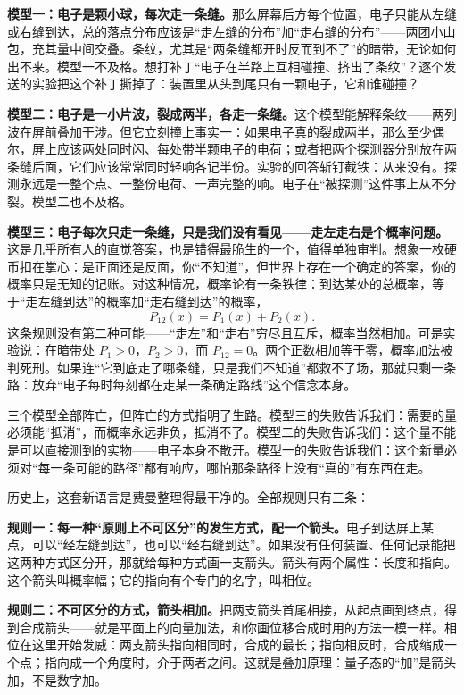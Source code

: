 \textbf{模型一：电子是颗小球，每次走一条缝。}那么屏幕后方每个位置，电子只能从左缝或右缝到达，总的落点分布应该是“走左缝的分布”加“走右缝的分布”——两团小山包，充其量中间交叠。条纹，尤其是“两条缝都开时反而到不了”的暗带，无论如何出不来。模型一不及格。想打补丁“电子在半路上互相碰撞、挤出了条纹”？逐个发送的实验把这个补丁撕掉了：装置里从头到尾只有一颗电子，它和谁碰撞？

\textbf{模型二：电子是一小片波，裂成两半，各走一条缝。}这个模型能解释条纹——两列波在屏前叠加干涉。但它立刻撞上事实一：如果电子真的裂成两半，那么至少偶尔，屏上应该两处同时闪、每处带半颗电子的电荷；或者把两个探测器分别放在两条缝后面，它们应该常常同时轻响各记半份。实验的回答斩钉截铁：从来没有。探测永远是一整个点、一整份电荷、一声完整的响。电子在“被探测”这件事上从不分裂。模型二也不及格。

\textbf{模型三：电子每次只走一条缝，只是我们没有看见——走左走右是个概率问题。}这是几乎所有人的直觉答案，也是错得最脆生的一个，值得单独审判。想象一枚硬币扣在掌心：是正面还是反面，你“不知道”，但世界上存在一个确定的答案，你的概率只是无知的记账。对这种情况，概率论有一条铁律：到达某处的总概率，等于“走左缝到达”的概率加“走右缝到达”的概率，
\[
P_{12}(x) = P_1(x) + P_2(x).
\]
这条规则没有第二种可能——“走左”和“走右”穷尽且互斥，概率当然相加。可是实验说：在暗带处 \(P_1 > 0\)，\(P_2 > 0\)，而 \(P_{12} = 0\)。两个正数相加等于零，概率加法被判死刑。如果连“它到底走了哪条缝，只是我们不知道”都救不了场，那就只剩一条路：放弃“电子每时每刻都在走某一条确定路线”这个信念本身。

三个模型全部阵亡，但阵亡的方式指明了生路。模型三的失败告诉我们：需要的量必须能“抵消”，而概率永远非负，抵消不了。模型二的失败告诉我们：这个量不能是可以直接测到的实物——电子本身不散开。模型一的失败告诉我们：这个新量必须对“每一条可能的路径”都有响应，哪怕那条路径上没有“真的”有东西在走。


历史上，这套新语言是费曼整理得最干净的。全部规则只有三条：

\textbf{规则一：每一种“原则上不可区分”的发生方式，配一个箭头。}电子到达屏上某点，可以“经左缝到达”，也可以“经右缝到达”。如果没有任何装置、任何记录能把这两种方式区分开，那就给每种方式画一支箭头。箭头有两个属性：长度和指向。这个箭头叫概率幅；它的指向有个专门的名字，叫相位。

\textbf{规则二：不可区分的方式，箭头相加。}把两支箭头首尾相接，从起点画到终点，得到合成箭头——就是平面上的向量加法，和你画位移合成时用的方法一模一样。相位在这里开始发威：两支箭头指向相同时，合成的最长；指向相反时，合成缩成一个点；指向成一个角度时，介于两者之间。这就是叠加原理：量子态的“加”是箭头加，不是数字加。

